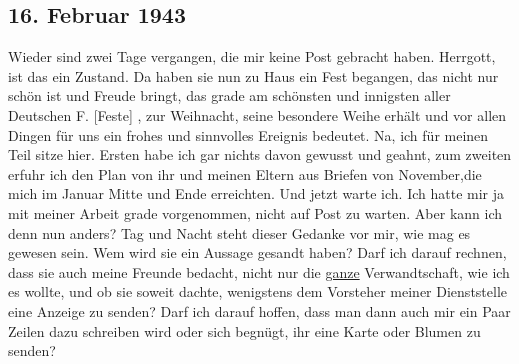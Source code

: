 \subsection{16. Februar 1943}

Wieder sind zwei Tage vergangen, die mir keine Post gebracht haben.
Herrgott, ist das ein Zustand.
Da haben sie nun zu Haus ein Fest begangen, das nicht nur sch\"{o}n ist und Freude bringt, das grade am sch\"{o}nsten und innigsten aller Deutschen F.{\color{red} [Feste] }, zur Weihnacht, seine besondere Weihe erh\"{a}lt und vor allen Dingen f\"{u}r uns ein frohes und sinnvolles Ereignis bedeutet.
Na, ich f\"{u}r meinen Teil sitze hier.
Ersten habe ich gar nichts davon gewusst und geahnt, zum zweiten erfuhr ich den Plan von ihr und meinen Eltern aus Briefen von November,die mich im Januar Mitte und Ende erreichten.
Und jetzt warte ich.
Ich hatte mir ja mit meiner Arbeit grade vorgenommen, nicht auf Post zu warten.
Aber kann ich denn nun anders?
Tag und Nacht steht dieser Gedanke vor mir, wie mag es gewesen sein.
Wem wird sie ein Aussage gesandt haben?
Darf ich darauf rechnen, dass sie auch meine Freunde bedacht, nicht nur die \ul{ganze} Verwandtschaft, wie ich es wollte, und ob sie soweit dachte, wenigstens dem Vorsteher meiner Dienststelle eine Anzeige zu senden?
Darf ich darauf hoffen, dass man dann auch mir ein Paar Zeilen dazu schreiben wird oder sich begn\"{u}gt, ihr eine Karte oder Blumen zu senden?
\clearpage
